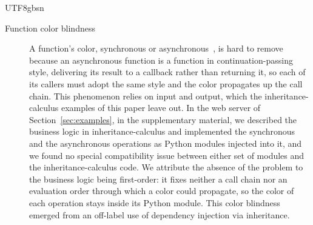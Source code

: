 \begin{CJK*}{UTF8}{gbsn}
\begin{description}
  \item[Function color blindness]\label{sec:practical-function-color}
    A function's color, synchronous or
    asynchronous~\cite{nystrom2015-function-color}, is hard to remove
    because an asynchronous function is a function in
    continuation-passing style, delivering its result to a callback rather
    than returning it, so each of its callers must adopt the same style and
    the color propagates up the call chain.
    This phenomenon relies on input and output, which the inheritance-calculus
    examples of this paper leave out. In the web server of
    Section~\ref{sec:examples}, in the supplementary material, we described the business logic in
    inheritance-calculus and implemented the synchronous and the asynchronous
    operations as Python modules injected into it, and we found no special
    compatibility issue between either set of modules and the inheritance-calculus code.
    We attribute the absence of the problem to the business logic being
    first-order: it fixes neither a call chain nor an evaluation order
    through which a color could propagate, so the color of each operation
    stays inside its Python module.
    This color blindness emerged from an off-label use of dependency
    injection via inheritance.

\end{description}
\fi

\section{}
\label{sec:semantic-variants}



\end{CJK*}
